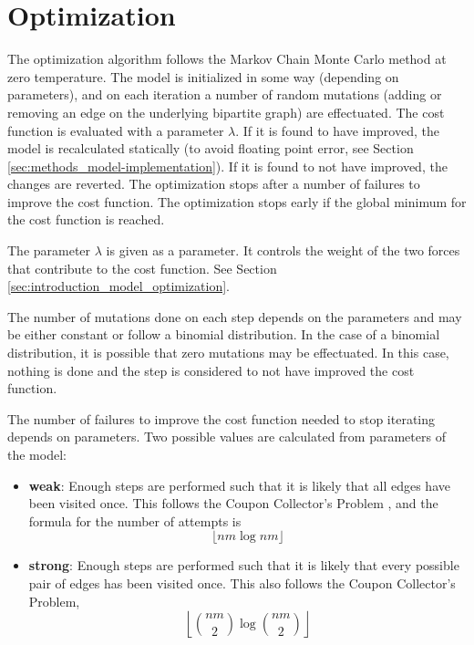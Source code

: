 \section{Optimization}
\label{sec:methods_optimization}

The optimization algorithm follows the Markov Chain Monte Carlo method at zero temperature.
The model is initialized in some way (depending on parameters), and on each iteration a number of random mutations (adding or removing an edge on the underlying bipartite graph) are effectuated.
The cost function is evaluated with a parameter $\lambda$.
If it is found to have improved, the model is recalculated statically (to avoid floating point error, see Section \ref{sec:methods_model-implementation}).
If it is found to not have improved, the changes are reverted.
The optimization stops after a number of failures to improve the cost function.
The optimization stops early if the global minimum for the cost function is reached.

The parameter $\lambda$ is given as a parameter.
It controls the weight of the two forces that contribute to the cost function.
See Section \ref{sec:introduction_model_optimization}.

The number of mutations done on each step depends on the parameters and may be either constant or follow a binomial distribution.
In the case of a binomial distribution, it is possible that zero mutations may be effectuated.
In this case, nothing is done and the step is considered to not have improved the cost function.

The number of failures to improve the cost function needed to stop iterating depends on parameters.
Two possible values are calculated from parameters of the model:
\begin{itemize}
\item \textbf{weak}:
  Enough steps are performed such that it is likely that all edges have been visited once.
  This follows the Coupon Collector's Problem \cite{Mitzenmacher2017}, and the formula for the number of attempts is
  \begin{equation*}
    \lfloor nm \log nm \rfloor
  \end{equation*}
\item \textbf{strong}:
  Enough steps are performed such that it is likely that every possible pair of edges has been visited once.
  This also follows the Coupon Collector's Problem,
  \begin{equation*}
    \left\lfloor {nm \choose 2} \log {nm \choose 2} \right\rfloor
  \end{equation*}
\end{itemize}

